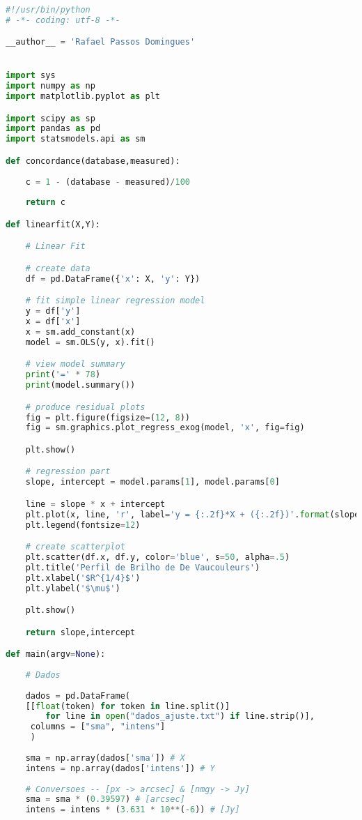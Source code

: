 \documentclass[a4paper, 11pt, fleqn, leqno]{article}
\begin{document}
\small{
\begin{lstlisting}[language=Python]

#!/usr/bin/python
# -*- coding: utf-8 -*-

__author__ = 'Rafael Passos Domingues'


import sys
import numpy as np
import matplotlib.pyplot as plt

import scipy as sp
import pandas as pd
import statsmodels.api as sm

def concordance(database,measured):
    
    c = 1 - (database - measured)/100
    
    return c

def linearfit(X,Y):

    # Linear Fit

    # create data
    df = pd.DataFrame({'x': X, 'y': Y})

    # fit simple linear regression model
    y = df['y']
    x = df['x']
    x = sm.add_constant(x)
    model = sm.OLS(y, x).fit()

    # view model summary
    print('=' * 78)
    print(model.summary())

    # produce residual plots
    fig = plt.figure(figsize=(12, 8))
    fig = sm.graphics.plot_regress_exog(model, 'x', fig=fig)

    plt.show()

    # regression part
    slope, intercept = model.params[1], model.params[0]

    line = slope * x + intercept
    plt.plot(x, line, 'r', label='y = {:.2f}*X + ({:.2f})'.format(slope, intercept))
    plt.legend(fontsize=12)

    # create scatterplot
    plt.scatter(df.x, df.y, color='blue', s=50, alpha=.5)
    plt.title('Perfil de Brilho de De Vaucouleurs')
    plt.xlabel('$R^{1/4}$')
    plt.ylabel('$\mu$')

    plt.show()

    return slope,intercept

def main(argv=None):
    
    # Dados
    
    dados = pd.DataFrame(
    [[float(token) for token in line.split()]  
        for line in open("dados_ajuste.txt") if line.strip()],
     columns = ["sma", "intens"]
     )
    
    sma = np.array(dados['sma']) # X
    intens = np.array(dados['intens']) # Y
    
    # Conversoes -- [px -> arcsec] & [nmgy -> Jy]
    sma = sma * (0.39597) # [arcsec]
    intens = intens * (3.631 * 10**(-6)) # [Jy]
    

\end{lstlisting}}
\end{document}
